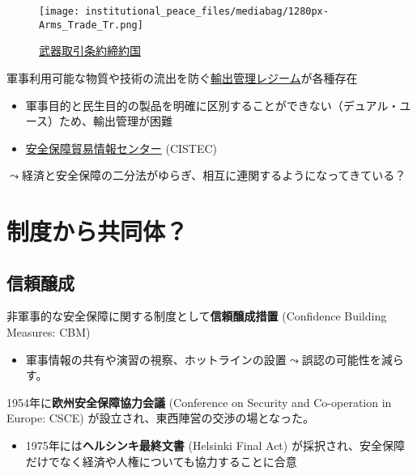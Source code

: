 \documentclass[
  xelatex,
  ja=standard]{bxjsarticle}
\providecommand{\tightlist}{%
  \setlength{\itemsep}{0pt}\setlength{\parskip}{0pt}}\usepackage{longtable,booktabs,array}
\begin{document}
\begin{figure}[htpb]

{\centering \texttt{[image: institutional\_peace\_files/mediabag/1280px-Arms\_Trade\_Tr.png]}

}

\caption{\href{https://commons.wikimedia.org/wiki/File:Arms_Trade_Treaty_status.svg}{武器取引条約締約国}}

\end{figure}

軍事利用可能な物質や技術の流出を防ぐ\href{https://www.mofa.go.jp/mofaj/gaiko/regime/index.html}{輸出管理レジーム}が各種存在

\begin{itemize}
\tightlist
\item
  軍事目的と民生目的の製品を明確に区別することができない（デュアル・ユース）ため、輸出管理が困難
\item
  \href{https://www.cistec.or.jp/export/yukan_kiso/index.html}{安全保障貿易情報センター}
  (CISTEC)
\end{itemize}

\(\leadsto\)経済と安全保障の二分法がゆらぎ、相互に連関するようになってきている？

\hypertarget{ux5236ux5ea6ux304bux3089ux5171ux540cux4f53}{%
\section{制度から共同体？}\label{ux5236ux5ea6ux304bux3089ux5171ux540cux4f53}}

\hypertarget{ux4fe1ux983cux91b8ux6210}{%
\subsection{信頼醸成}\label{ux4fe1ux983cux91b8ux6210}}

非軍事的な安全保障に関する制度として\textbf{信頼醸成措置} (Confidence
Building Measures: CBM)

\begin{itemize}
\tightlist
\item
  軍事情報の共有や演習の視察、ホットラインの設置\(\leadsto\)誤認の可能性を減らす。
\end{itemize}

1954年に\textbf{欧州安全保障協力会議} (Conference on Security and
Co-operation in Europe: CSCE) が設立され、東西陣営の交渉の場となった。

\begin{itemize}
\tightlist
\item
  1975年には\textbf{ヘルシンキ最終文書} (Helsinki Final Act)
  が採択され、安全保障だけでなく経済や人権についても協力することに合意
\end{itemize}
\end{document}
